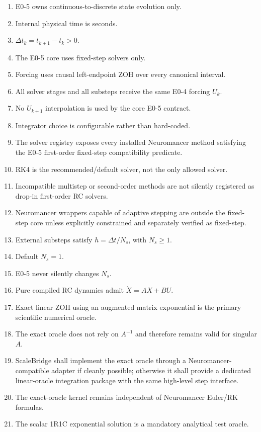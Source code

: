 \documentclass[11pt]{article}
\begin{document}
\begin{enumerate}[leftmargin=*]
\item E0-5 owns continuous-to-discrete state evolution only.
\item Internal physical time is seconds.
\item $\Delta t_k=t_{k+1}-t_k>0$.
\item The E0-5 core uses fixed-step solvers only.
\item Forcing uses causal left-endpoint ZOH over every canonical interval.
\item All solver stages and all substeps receive the same E0-4 forcing $U_k$.
\item No $U_{k+1}$ interpolation is used by the core E0-5 contract.
\item Integrator choice is configurable rather than hard-coded.
\item The solver registry exposes every installed Neuromancer method satisfying
the E0-5 first-order fixed-step compatibility predicate.
\item RK4 is the recommended/default solver, not the only allowed solver.
\item Incompatible multistep or second-order methods are not silently registered
as drop-in first-order RC solvers.
\item Neuromancer wrappers capable of adaptive stepping are outside the fixed-step
core unless explicitly constrained and separately verified as fixed-step.
\item External substeps satisfy $h=\Delta t/N_s$, with $N_s\ge1$.
\item Default $N_s=1$.
\item E0-5 never silently changes $N_s$.
\item Pure compiled RC dynamics admit $\dot X=AX+BU$.
\item Exact linear ZOH using an augmented matrix exponential is the primary
scientific numerical oracle.
\item The exact oracle does not rely on $A^{-1}$ and therefore remains valid for
singular $A$.
\item ScaleBridge shall implement the exact oracle through a Neuromancer-compatible
adapter if cleanly possible; otherwise it shall provide a dedicated linear-oracle
integration package with the same high-level step interface.
\item The exact-oracle kernel remains independent of Neuromancer Euler/RK formulas.
\item The scalar 1R1C exponential solution is a mandatory analytical test oracle.

\end{enumerate}
\end{document}
